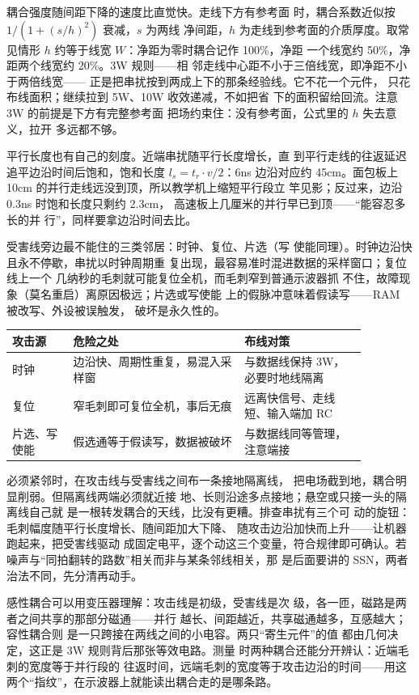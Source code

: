 耦合强度随间距下降的速度比直觉快。走线下方有参考面
时，耦合系数近似按 $1/(1+(s/h)^2)$ 衰减，$s$ 为两线
净间距，$h$ 为走线到参考面的介质厚度。取常见情形
$h$ 约等于线宽 $W$：净距为零时耦合记作 100\%，净距
一个线宽约 50\%，净距两个线宽约 20\%。3W 规则——相
邻走线中心距不小于三倍线宽，即净距不小于两倍线宽——
正是把串扰按到两成上下的那条经验线。它不花一个元件，
只花布线面积；继续拉到 5W、10W 收效递减，不如把省
下的面积留给回流。注意 3W 的前提是下方有完整参考面
把场约束住：没有参考面，公式里的 $h$ 失去意义，拉开
多远都不够。

平行长度也有自己的刻度。近端串扰随平行长度增长，直
到平行走线的往返延迟追平边沿时间后饱和，饱和长度
$l_s=t_r\cdot v/2$：6ns 边沿对应约 45cm。面包板上
10cm 的并行走线远没到顶，所以教学机上缩短平行段立
竿见影；反过来，边沿 0.3ns 时饱和长度只剩约 2.3cm，
高速板上几厘米的并行早已到顶——“能容忍多长的并
行”，同样要拿边沿时间去比。

受害线旁边最不能住的三类邻居：时钟、复位、片选（写
使能同理）。时钟边沿快且永不停歇，串扰以时钟周期重
复出现，最容易准时混进数据的采样窗口；复位线上一个
几纳秒的毛刺就可能复位全机，而毛刺窄到普通示波器抓
不住，故障现象（莫名重启）离原因极远；片选或写使能
上的假脉冲意味着假读写——RAM 被改写、外设被误触发，
破坏是永久性的。

\begin{longtable}{L{0.15\linewidth}L{0.42\linewidth}L{0.3\linewidth}}
\toprule
攻击源 & 危险之处 & 布线对策 \\
\midrule
时钟 & 边沿快、周期性重复，易混入采样窗 & 与数据线保持 3W，必要时地线隔离 \\\tablerowrule
复位 & 窄毛刺即可复位全机，事后无痕 & 远离快信号、走线短、输入端加 RC \\\tablerowrule
片选、写使能 & 假选通等于假读写，数据被破坏 & 与数据线同等管理，注意端接 \\
\bottomrule
\end{longtable}

必须紧邻时，在攻击线与受害线之间布一条接地隔离线，
把电场截到地，耦合明显削弱。但隔离线两端必须就近接
地、长则沿途多点接地；悬空或只接一头的隔离线自己就
是一根转发耦合的天线，比没有更糟。排查串扰有三个可
动的旋钮：毛刺幅度随平行长度增长、随间距加大下降、
随攻击边沿加快而上升——让机器跑起来，把受害线驱动
成固定电平，逐个动这三个变量，符合规律即可确认。若
噪声与“同拍翻转的路数”相关而非与某条邻线相关，那
是后面要讲的 SSN，两者治法不同，先分清再动手。

感性耦合可以用变压器理解：攻击线是初级，受害线是次
级，各一匝，磁路是两者之间共享的那部分磁通——并行
越长、间距越近，共享磁通越多，互感越大；容性耦合则
是一只跨接在两线之间的小电容。两只“寄生元件”的值
都由几何决定，这正是 3W 规则背后那张等效电路。测量
时两种耦合还能分开辨认：近端毛刺的宽度等于并行段的
往返时间，远端毛刺的宽度等于攻击边沿的时间——用这
两个“指纹”，在示波器上就能读出耦合走的是哪条路。

